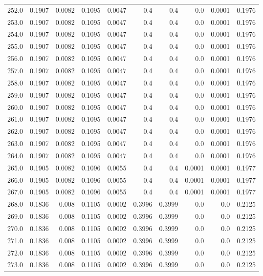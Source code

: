 \begin{longtable}{lrrrrrrrrr}
252.0 & 0.1907 & 0.0082 & 0.1095 & 0.0047 & 0.4 & 0.4 & 0.0 & 0.0001 & 0.1976 \\
253.0 & 0.1907 & 0.0082 & 0.1095 & 0.0047 & 0.4 & 0.4 & 0.0 & 0.0001 & 0.1976 \\
254.0 & 0.1907 & 0.0082 & 0.1095 & 0.0047 & 0.4 & 0.4 & 0.0 & 0.0001 & 0.1976 \\
255.0 & 0.1907 & 0.0082 & 0.1095 & 0.0047 & 0.4 & 0.4 & 0.0 & 0.0001 & 0.1976 \\
256.0 & 0.1907 & 0.0082 & 0.1095 & 0.0047 & 0.4 & 0.4 & 0.0 & 0.0001 & 0.1976 \\
257.0 & 0.1907 & 0.0082 & 0.1095 & 0.0047 & 0.4 & 0.4 & 0.0 & 0.0001 & 0.1976 \\
258.0 & 0.1907 & 0.0082 & 0.1095 & 0.0047 & 0.4 & 0.4 & 0.0 & 0.0001 & 0.1976 \\
259.0 & 0.1907 & 0.0082 & 0.1095 & 0.0047 & 0.4 & 0.4 & 0.0 & 0.0001 & 0.1976 \\
260.0 & 0.1907 & 0.0082 & 0.1095 & 0.0047 & 0.4 & 0.4 & 0.0 & 0.0001 & 0.1976 \\
261.0 & 0.1907 & 0.0082 & 0.1095 & 0.0047 & 0.4 & 0.4 & 0.0 & 0.0001 & 0.1976 \\
262.0 & 0.1907 & 0.0082 & 0.1095 & 0.0047 & 0.4 & 0.4 & 0.0 & 0.0001 & 0.1976 \\
263.0 & 0.1907 & 0.0082 & 0.1095 & 0.0047 & 0.4 & 0.4 & 0.0 & 0.0001 & 0.1976 \\
264.0 & 0.1907 & 0.0082 & 0.1095 & 0.0047 & 0.4 & 0.4 & 0.0 & 0.0001 & 0.1976 \\
265.0 & 0.1905 & 0.0082 & 0.1096 & 0.0055 & 0.4 & 0.4 & 0.0001 & 0.0001 & 0.1977 \\
266.0 & 0.1905 & 0.0082 & 0.1096 & 0.0055 & 0.4 & 0.4 & 0.0001 & 0.0001 & 0.1977 \\
267.0 & 0.1905 & 0.0082 & 0.1096 & 0.0055 & 0.4 & 0.4 & 0.0001 & 0.0001 & 0.1977 \\
268.0 & 0.1836 & 0.008 & 0.1105 & 0.0002 & 0.3996 & 0.3999 & 0.0 & 0.0 & 0.2125 \\
269.0 & 0.1836 & 0.008 & 0.1105 & 0.0002 & 0.3996 & 0.3999 & 0.0 & 0.0 & 0.2125 \\
270.0 & 0.1836 & 0.008 & 0.1105 & 0.0002 & 0.3996 & 0.3999 & 0.0 & 0.0 & 0.2125 \\
271.0 & 0.1836 & 0.008 & 0.1105 & 0.0002 & 0.3996 & 0.3999 & 0.0 & 0.0 & 0.2125 \\
272.0 & 0.1836 & 0.008 & 0.1105 & 0.0002 & 0.3996 & 0.3999 & 0.0 & 0.0 & 0.2125 \\
273.0 & 0.1836 & 0.008 & 0.1105 & 0.0002 & 0.3996 & 0.3999 & 0.0 & 0.0 & 0.2125 \\

\end{longtable}

